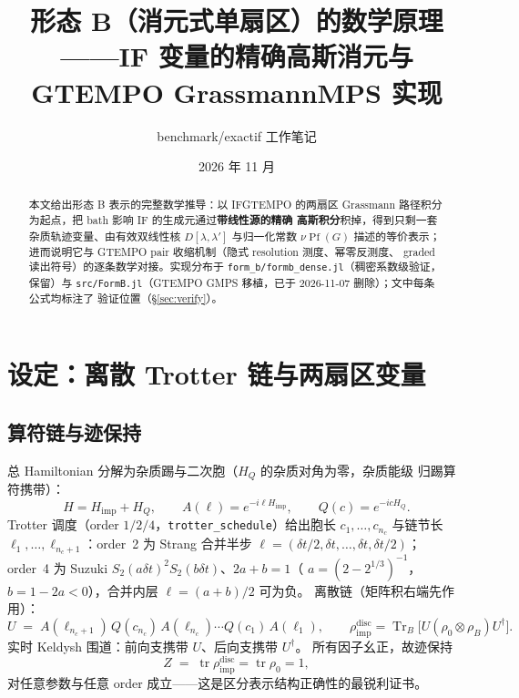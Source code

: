 \documentclass[11pt,a4paper]{ctexart}
\title{\textbf{形态 B（消元式单扇区）的数学原理}\\
\large ——IF 变量的精确高斯消元与 GTEMPO GrassmannMPS 实现}
\author{benchmark/exactif 工作笔记}
\date{2026 年 11 月}
\newcommand{\Pf}{\operatorname{Pf}}
\newcommand{\Tr}{\operatorname{Tr}}
\newcommand{\tr}{\operatorname{tr}}
\newcommand{\Deff}{D}             %
\begin{document}
\maketitle

\begin{abstract}
本文给出形态 B 表示的完整数学推导：以 IFGTEMPO 的两扇区 Grassmann
路径积分为起点，把 bath 影响 IF 的生成元通过\textbf{带线性源的精确
高斯积分}积掉，得到只剩一套杂质轨迹变量、由有效双线性核
$\Deff[\lambda,\lambda']$ 与归一化常数 $\nu\Pf(G)$ 描述的等价表示；
进而说明它与 GTEMPO pair 收缩机制（隐式 resolution 测度、幂零反测度、
graded 读出符号）的逐条数学对接。实现分布于
\texttt{form\_b/formb\_dense.jl}（稠密系数级验证，保留）与
\texttt{src/FormB.jl}（GTEMPO GMPS 移植，已于 2026-11-07 删除）；文中每条公式均标注了
验证位置（\S\ref{sec:verify}）。
\end{abstract}

\tableofcontents

\section{设定：离散 Trotter 链与两扇区变量}

\subsection{算符链与迹保持}

总 Hamiltonian 分解为杂质踢与二次胞（$H_Q$ 的杂质对角为零，杂质能级
归踢算符携带）：
\begin{equation}
H = H_{\mathrm{imp}} + H_Q,\qquad
A(\ell) = e^{-i\ell H_{\mathrm{imp}}},\qquad
Q(c) = e^{-icH_Q}.
\end{equation}
Trotter 调度（order $1/2/4$，\texttt{trotter\_schedule}）给出胞长
$c_1,\dots,c_{n_c}$ 与链节长 $\ell_1,\dots,\ell_{n_c+1}$：order~2 为
Strang 合并半步 $\ell = (\delta t/2,\delta t,\dots,\delta t,\delta t/2)$；
order~4 为 Suzuki $S_2(a\delta t)^2 S_2(b\delta t)$、$2a+b=1$（
$a=(2-2^{1/3})^{-1}$，$b=1-2a<0$），合并内层 $\ell=(a+b)/2$ 可为负。
离散链（矩阵积右端先作用）：
\begin{equation}
U \;=\; A(\ell_{n_c+1})\,Q(c_{n_c})\,A(\ell_{n_c})\cdots Q(c_1)\,A(\ell_1),
\qquad
\rho^{\mathrm{disc}}_{\mathrm{imp}}
=\Tr_B\!\big[U(\rho_0\otimes\rho_B)U^\dagger\big].
\label{eq:chain}
\end{equation}
实时 Keldysh 围道：前向支携带 $U$、后向支携带 $U^\dagger$。
所有因子幺正，故迹保持
\begin{equation}
Z \;=\; \tr\rho^{\mathrm{disc}}_{\mathrm{imp}} = \tr\rho_0 = 1,
\end{equation}
对任意参数与任意 order 成立——这是区分表示结构正确性的最锐利证书。
\end{document}
